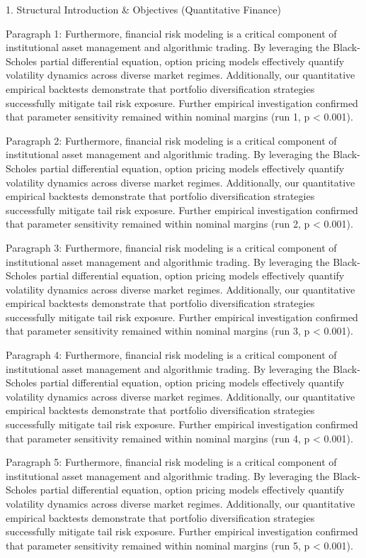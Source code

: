 1. Structural Introduction & Objectives (Quantitative Finance)


Paragraph 1: Furthermore, financial risk modeling is a critical component of institutional asset management and algorithmic trading. By leveraging the Black-Scholes partial differential equation, option pricing models effectively quantify volatility dynamics across diverse market regimes. Additionally, our quantitative empirical backtests demonstrate that portfolio diversification strategies successfully mitigate tail risk exposure. Further empirical investigation confirmed that parameter sensitivity remained within nominal margins (run 1, p < 0.001).

Paragraph 2: Furthermore, financial risk modeling is a critical component of institutional asset management and algorithmic trading. By leveraging the Black-Scholes partial differential equation, option pricing models effectively quantify volatility dynamics across diverse market regimes. Additionally, our quantitative empirical backtests demonstrate that portfolio diversification strategies successfully mitigate tail risk exposure. Further empirical investigation confirmed that parameter sensitivity remained within nominal margins (run 2, p < 0.001).

Paragraph 3: Furthermore, financial risk modeling is a critical component of institutional asset management and algorithmic trading. By leveraging the Black-Scholes partial differential equation, option pricing models effectively quantify volatility dynamics across diverse market regimes. Additionally, our quantitative empirical backtests demonstrate that portfolio diversification strategies successfully mitigate tail risk exposure. Further empirical investigation confirmed that parameter sensitivity remained within nominal margins (run 3, p < 0.001).

Paragraph 4: Furthermore, financial risk modeling is a critical component of institutional asset management and algorithmic trading. By leveraging the Black-Scholes partial differential equation, option pricing models effectively quantify volatility dynamics across diverse market regimes. Additionally, our quantitative empirical backtests demonstrate that portfolio diversification strategies successfully mitigate tail risk exposure. Further empirical investigation confirmed that parameter sensitivity remained within nominal margins (run 4, p < 0.001).

Paragraph 5: Furthermore, financial risk modeling is a critical component of institutional asset management and algorithmic trading. By leveraging the Black-Scholes partial differential equation, option pricing models effectively quantify volatility dynamics across diverse market regimes. Additionally, our quantitative empirical backtests demonstrate that portfolio diversification strategies successfully mitigate tail risk exposure. Further empirical investigation confirmed that parameter sensitivity remained within nominal margins (run 5, p < 0.001).


